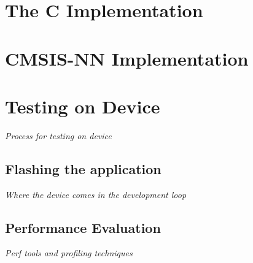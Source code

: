 \section{The C Implementation}
\textit{}

\section{CMSIS-NN Implementation}
\textit{}

\section{Testing on Device}
\textit{Process for testing on device}

\subsection{Flashing the application}
\textit{Where the device comes in the development loop}

\subsection{Performance Evaluation}
\textit{Perf tools and profiling techniques}
